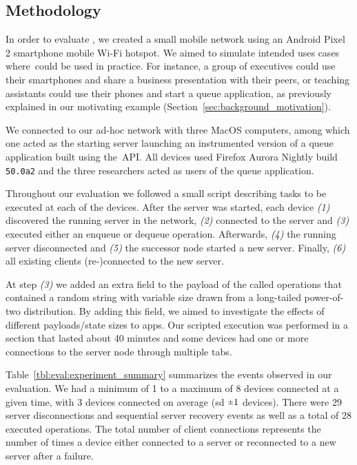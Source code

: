 \subsection{Methodology}
\label{sub:eval:evaluation_methodology}

In order to evaluate \APINameNoSpace, we created a small mobile network using an Android Pixel 2 smartphone mobile Wi-Fi hotspot.
We aimed to simulate intended uses cases where~\APIName could be used in practice. 
For instance, a group of executives could use their smartphones and share a business presentation with their peers, or teaching assistants could use their phones and start a queue application, as previously explained in our motivating example (Section~\ref{sec:background_motivation}).


We connected to our ad-hoc network with three MacOS computers, among which one acted as the starting server launching an instrumented version of a queue application built using the~\APIName API. 
All devices used Firefox Aurora Nightly build {\texttt{50.0a2}} and the three researchers acted as users of the queue application.


Throughout our evaluation we followed a small script describing tasks to be executed at each of the devices. 
After the server was started, each device
{\it (1)} discovered the running server in the network,
{\it (2)} connected to the server and
{\it (3)} executed either an enqueue or dequeue operation.
Afterwards,  
{\it (4)} the running server disconnected and 
{\it (5)} the successor node started a new server.
Finally, 
{\it (6)} all existing clients (re-)connected to the new server.

At step {\it (3)} we added an extra field to the payload of the called operations that contained a random string with variable size drawn from a long-tailed power-of-two distribution. 
By adding this field, we aimed to investigate the effects of different payloads/state sizes to \APIshort apps.
Our scripted execution was performed in a section that lasted about 40 minutes and some devices had one or more connections to the server node through multiple tabs.


Table~\ref{tbl:eval:experiment_summary} summarizes the events observed in our evaluation.
We had a minimum of 1 to a maximum of 8 devices connected at a given time, with 3 devices connected on average (sd $\rpm 1$ devices). 
There were 29 server disconnections and sequential server recovery events as well as a total of  28 executed operations. 
The total number of client connections represents the number of times a device either connected to a server or reconnected to a new server after a failure.

